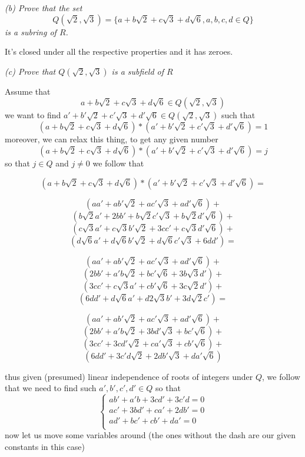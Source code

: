 \documentclass[11pt,oneside,titlepage]{book}
\newcommand{\set}[1]{\{ #1 \}}
\begin{document}
\textit{(b) Prove that the set
  $$Q(\sqrt{2}, \sqrt{3}) = \set{a + b\sqrt{2} + c\sqrt{3} + d\sqrt{6}, a, b, c, d \in Q}$$
  is a subring of $R$.
}

It's closed under all the respective properties and it has zeroes.

\textit{(c) Prove that $Q(\sqrt{2}, \sqrt{3})$ is a subfield of $R$}

Assume that
$$a + b\sqrt{2} + c\sqrt{3} + d\sqrt{6} \in Q(\sqrt{2}, \sqrt{3})$$
we want to find $a' + b'\sqrt{2} + c'\sqrt{3} + d'\sqrt{6} \in Q(\sqrt{2}, \sqrt{3})$ such that
$$ (a + b\sqrt{2} + c\sqrt{3} + d\sqrt{6}) * (a' + b'\sqrt{2} + c'\sqrt{3} + d'\sqrt{6}) = 1$$
moreover, we can relax this thing, to get any given number
$$ (a + b\sqrt{2} + c\sqrt{3} + d\sqrt{6}) * (a' + b'\sqrt{2} + c'\sqrt{3} + d'\sqrt{6}) = j$$
so that $j \in Q$ and $j \neq 0$
we follow that

$$(a + b\sqrt{2} + c\sqrt{3} + d\sqrt{6}) * (a' + b'\sqrt{2} + c'\sqrt{3} + d'\sqrt{6}) = $$

$$ (a a' + a b'\sqrt{2} + a c'\sqrt{3} + a d'\sqrt{6}) + $$
$$ (b \sqrt{2} a' + 2 b b' + b \sqrt{2} c'\sqrt{3} + b \sqrt{2} d'\sqrt{6}) + $$
$$ ( c\sqrt{3} a' + c\sqrt{3} b'\sqrt{2}  + 3 c c' + c\sqrt{3} d'\sqrt{6}) + $$
$$ ( d\sqrt{6} a' + d\sqrt{6} b'\sqrt{2}  + d\sqrt{6} c'\sqrt{3}  + 6 d d') = $$

$$ (a a' +     a b'\sqrt{2} +              a c'\sqrt{3} +              a d'\sqrt{6}) + $$
$$ (2 b b' +   a' b \sqrt{2} +             b  c'\sqrt{6} +             3 b  \sqrt{3} d') + $$
$$ (3 c c' +   c\sqrt{3} a' +              cb'\sqrt{6} +               3 c \sqrt{2} d') + $$
$$ (6 d d' +   d\sqrt{6} a' +              d2\sqrt{3} b' +             3 d\sqrt{2} c') = $$

$$ (a a' +     a b'\sqrt{2} +              a c'\sqrt{3} +              a d'\sqrt{6}  ) + $$
$$ (2 b b' +   a' b \sqrt{2} +             3 b d' \sqrt{3}  +           b c'\sqrt{6}  ) + $$
$$ (3 c c' +   3 c d' \sqrt{2} +           c a' \sqrt{3} +              cb'\sqrt{6}   ) + $$
$$ (6 d d' +   3 c'd \sqrt{2} +           2 db'\sqrt{3}  +            da'\sqrt{6} ) $$

thus given (presumed) linear independence of roots of integers under $Q$, we follow that we need
to find such $a', b', c', d' \in Q$ so that
$$
\begin{cases}
  ab' + a'b + 3cd' + 3c'd = 0 \\
  ac' + 3bd' + ca' + 2db' = 0  \\
  ad' + bc' + cb' + da' = 0  \\  
\end{cases}
$$
now let us move some variables around (the ones without the dash are
our given constants in this case)
\end{document}
